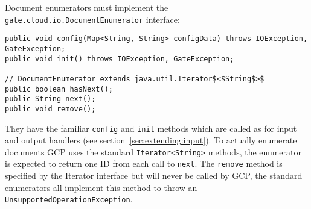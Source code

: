 Document enumerators must implement the \verb!gate.cloud.io.DocumentEnumerator!
interface:

\begin{lstlisting}[breaklines, texcl]
public void config(Map<String, String> configData) throws IOException, GateException;
public void init() throws IOException, GateException;

// DocumentEnumerator extends java.util.Iterator$<$String$>$
public boolean hasNext();
public String next();
public void remove();
\end{lstlisting}

They have the familiar \verb!config! and \verb!init! methods which are called
as for input and output handlers (see section~\ref{sec:extending:input}).  To
actually enumerate documents GCP uses the standard \verb!Iterator<String>!
methods, the enumerator is expected to return one ID from each call to
\verb!next!.  The \verb!remove! method is specified by the Iterator interface
but will never be called by GCP, the standard enumerators all implement this
method to throw an \verb!UnsupportedOperationException!.

